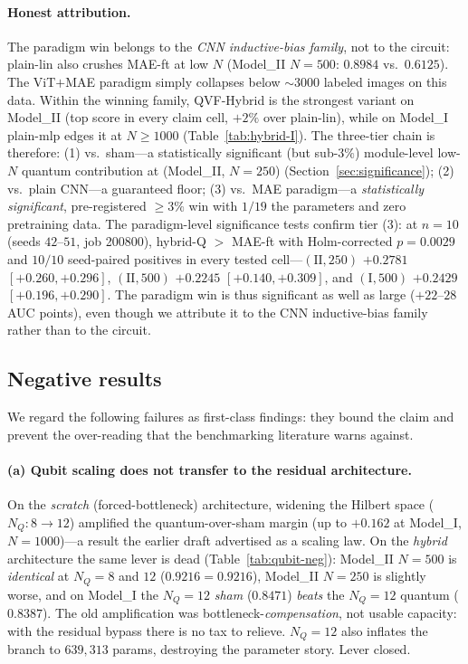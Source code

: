 \documentclass[10pt,letterpaper]{article}
\theoremstyle{plain}
\theoremstyle{definition}
\begin{document}
\paragraph{Honest attribution.}
The paradigm win belongs to the \emph{CNN inductive-bias family}, not to the
circuit: plain-lin also crushes MAE-ft at low $N$ (Model\_II $N{=}500$:
$0.8984$ vs.\ $0.6125$). The ViT$+$MAE paradigm simply collapses below
$\sim3000$ labeled images on this data. Within the winning family, QVF-Hybrid is
the strongest variant on Model\_II (top score in every claim cell, $+2\%$ over
plain-lin), while on Model\_I plain-mlp edges it at $N\geq1000$
(Table~\ref{tab:hybrid-I}). The three-tier chain is therefore:
(1) vs.\ sham---a statistically significant (but sub-$3\%$) module-level low-$N$
quantum contribution at (Model\_II, $N{=}250$) (Section~\ref{sec:significance});
(2) vs.\ plain CNN---a guaranteed floor;
(3) vs.\ MAE paradigm---a \emph{statistically significant}, pre-registered
$\geq 3\%$ win with $1/19$ the parameters and zero pretraining data.
The paradigm-level significance tests confirm tier (3): at $n{=}10$ (seeds
$42$--$51$, job 200800), hybrid-Q $>$ MAE-ft with Holm-corrected $p{=}0.0029$ and
$10/10$ seed-paired positives in every tested cell---$(\text{II},250)$ $+0.2781$
$[+0.260,+0.296]$, $(\text{II},500)$ $+0.2245$ $[+0.140,+0.309]$, and
$(\text{I},500)$ $+0.2429$ $[+0.196,+0.290]$. The paradigm win is thus significant
as well as large ($+22$--$28$ AUC points), even though we attribute it to the CNN
inductive-bias family rather than to the circuit.

\subsection{Negative results}
\label{sec:negative}

We regard the following failures as first-class findings: they bound the claim and
prevent the over-reading that the benchmarking literature warns against.

\paragraph{(a) Qubit scaling does not transfer to the residual architecture.}
On the \emph{scratch} (forced-bottleneck) architecture, widening the Hilbert space
($N_Q: 8\to12$) amplified the quantum-over-sham margin (up to $+0.162$ at
Model\_I, $N{=}1000$)---a result the earlier draft advertised as a scaling law.
On the \emph{hybrid} architecture the same lever is dead
(Table~\ref{tab:qubit-neg}): Model\_II $N{=}500$ is \emph{identical} at
$N_Q{=}8$ and $12$ ($0.9216 = 0.9216$), Model\_II $N{=}250$ is slightly worse,
and on Model\_I the $N_Q{=}12$ \emph{sham} ($0.8471$) \emph{beats} the
$N_Q{=}12$ quantum ($0.8387$). The old amplification was
bottleneck-\emph{compensation}, not usable capacity: with the residual bypass
there is no tax to relieve. $N_Q{=}12$ also inflates the branch to $639{,}313$
params, destroying the parameter story. Lever closed.
\end{document}
